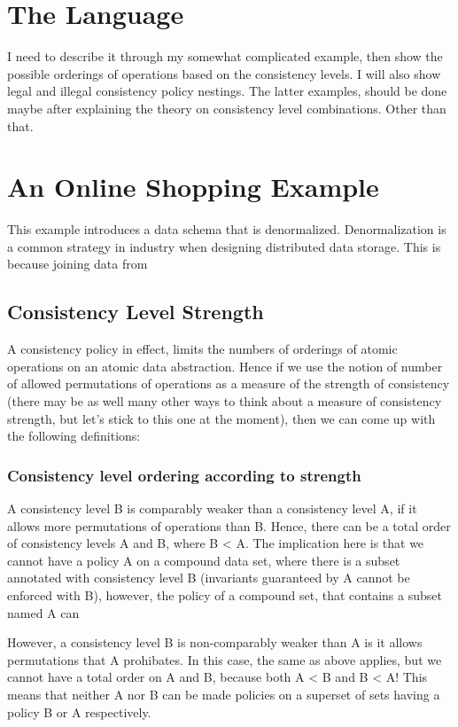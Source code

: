 

\section{The  Language}
I need to describe it through my somewhat complicated example, then show the
possible orderings of operations based on the consistency levels. I will also
show legal and illegal consistency policy nestings. The latter examples, should
be done maybe after explaining the theory on consistency level combinations.
Other than that. 

\section{An Online Shopping Example}
This example introduces a data schema that is denormalized. Denormalization is a
common strategy in industry when designing distributed data storage. This is
because joining data from 


\subsection{Consistency Level Strength}
A consistency policy in effect, limits the numbers of orderings of atomic
operations on an atomic data abstraction. Hence if we use the notion of number
of allowed permutations of operations as a measure of the strength of
consistency (there may be as well many other ways to think about a measure of
consistency strength, but let's stick to this one at the moment), then we can
come up with the following definitions:

\subsubsection{Consistency level ordering according to strength}
A consistency level B is comparably weaker than a consistency level A, if it
allows more permutations of operations than B. Hence, there can be a total order
of consistency levels A and B, where B < A. The implication here is that we
cannot have a policy A on a compound data set, where there is a subset annotated
with consistency level B (invariants guaranteed by A cannot be enforced with B),
however, the policy of a compound set, that contains a subset named A can 

However, a consistency level B is non-comparably weaker than A is it allows
permutations that A prohibates. In this case, the same as above applies, but we
cannot have a total order on A and B, because both A < B and B < A! This means
that neither A nor B can be made policies on a superset of sets having a policy
B or A respectively. 


